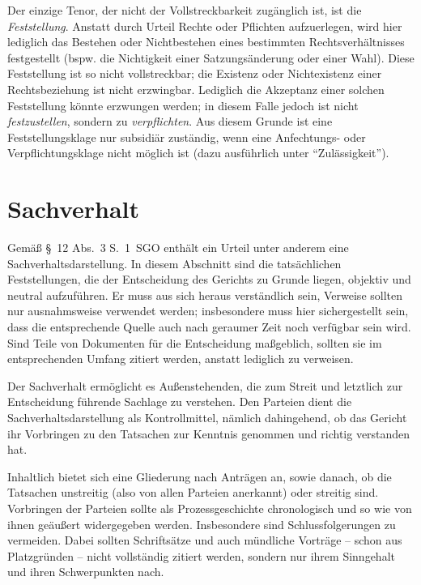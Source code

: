 Der einzige Tenor, der nicht der Vollstreckbarkeit zugänglich ist, ist die \emph{Feststellung}.
Anstatt durch Urteil Rechte oder Pflichten aufzuerlegen, wird hier lediglich das Bestehen oder Nichtbestehen eines bestimmten Rechtsverhältnisses festgestellt (bspw. die Nichtigkeit einer Satzungsänderung oder einer Wahl).
Diese Feststellung ist so nicht vollstreckbar; die Existenz oder Nichtexistenz einer Rechtsbeziehung ist nicht erzwingbar.
Lediglich die Akzeptanz einer solchen Feststellung könnte erzwungen werden; in diesem Falle jedoch ist nicht \emph{festzustellen}, sondern zu \emph{verpflichten}.
Aus diesem Grunde ist eine Feststellungsklage nur subsidiär zuständig, wenn eine Anfechtungs- oder Verpflichtungsklage nicht möglich ist (dazu ausführlich unter \enquote{Zulässigkeit}).

\section{Sachverhalt}
Gemäß \S~12 Abs.~3 S.~1~SGO enthält ein Urteil unter anderem eine Sachverhaltsdarstellung.
In diesem Abschnitt sind die tatsächlichen Feststellungen, die der Entscheidung des Gerichts zu Grunde liegen, objektiv und neutral aufzuführen.
Er muss aus sich heraus verständlich sein, Verweise sollten nur ausnahmsweise verwendet werden; insbesondere muss hier sichergestellt sein, dass die entsprechende Quelle auch nach geraumer Zeit noch verfügbar sein wird.
Sind Teile von Dokumenten für die Entscheidung maßgeblich, sollten sie im entsprechenden Umfang zitiert werden, anstatt lediglich zu verweisen.

Der Sachverhalt ermöglicht es Außenstehenden, die zum Streit und letztlich zur Entscheidung führende Sachlage zu verstehen.
Den Parteien dient die Sachverhaltsdarstellung als Kontrollmittel, nämlich dahingehend, ob das Gericht ihr Vorbringen zu den Tatsachen zur Kenntnis genommen und richtig verstanden hat.

Inhaltlich bietet sich eine Gliederung nach Anträgen an, sowie danach, ob die Tatsachen unstreitig (also von allen Parteien anerkannt) oder streitig sind.
Vorbringen der Parteien sollte als Prozessgeschichte chronologisch und so wie von ihnen geäußert widergegeben werden.
Insbesondere sind Schlussfolgerungen zu vermeiden.
Dabei sollten Schriftsätze und auch mündliche Vorträge – schon aus Platzgründen – nicht vollständig zitiert werden, sondern nur ihrem Sinngehalt und ihren Schwerpunkten nach.

